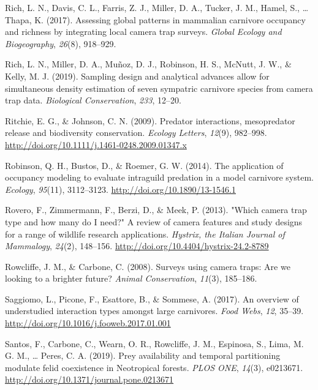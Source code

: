\documentclass[12pt,twoside]{reedthesis}
\begin{document}
\leavevmode\hypertarget{ref-rich_assessing_2017}{}%
Rich, L. N., Davis, C. L., Farris, Z. J., Miller, D. A., Tucker, J. M., Hamel, S., \ldots{} Thapa, K. (2017). Assessing global patterns in mammalian carnivore occupancy and richness by integrating local camera trap surveys. \emph{Global Ecology and Biogeography}, \emph{26}(8), 918--929.

\leavevmode\hypertarget{ref-rich_sampling_2019}{}%
Rich, L. N., Miller, D. A., Muñoz, D. J., Robinson, H. S., McNutt, J. W., \& Kelly, M. J. (2019). Sampling design and analytical advances allow for simultaneous density estimation of seven sympatric carnivore species from camera trap data. \emph{Biological Conservation}, \emph{233}, 12--20.

\leavevmode\hypertarget{ref-ritchie_predator_2009}{}%
Ritchie, E. G., \& Johnson, C. N. (2009). Predator interactions, mesopredator release and biodiversity conservation. \emph{Ecology Letters}, \emph{12}(9), 982--998. \url{http://doi.org/10.1111/j.1461-0248.2009.01347.x}

\leavevmode\hypertarget{ref-robinson_application_2014}{}%
Robinson, Q. H., Bustos, D., \& Roemer, G. W. (2014). The application of occupancy modeling to evaluate intraguild predation in a model carnivore system. \emph{Ecology}, \emph{95}(11), 3112--3123. \url{http://doi.org/10.1890/13-1546.1}

\leavevmode\hypertarget{ref-rovero_which_2013}{}%
Rovero, F., Zimmermann, F., Berzi, D., \& Meek, P. (2013). "Which camera trap type and how many do I need?" A review of camera features and study designs for a range of wildlife research applications. \emph{Hystrix, the Italian Journal of Mammalogy}, \emph{24}(2), 148--156. \url{http://doi.org/10.4404/hystrix-24.2-8789}

\leavevmode\hypertarget{ref-rowcliffe_surveys_2008}{}%
Rowcliffe, J. M., \& Carbone, C. (2008). Surveys using camera traps: Are we looking to a brighter future? \emph{Animal Conservation}, \emph{11}(3), 185--186.

\leavevmode\hypertarget{ref-saggiomo_overview_2017}{}%
Saggiomo, L., Picone, F., Esattore, B., \& Sommese, A. (2017). An overview of understudied interaction types amongst large carnivores. \emph{Food Webs}, \emph{12}, 35--39. \url{http://doi.org/10.1016/j.fooweb.2017.01.001}

\leavevmode\hypertarget{ref-santos_prey_2019}{}%
Santos, F., Carbone, C., Wearn, O. R., Rowcliffe, J. M., Espinosa, S., Lima, M. G. M., \ldots{} Peres, C. A. (2019). Prey availability and temporal partitioning modulate felid coexistence in Neotropical forests. \emph{PLOS ONE}, \emph{14}(3), e0213671. \url{http://doi.org/10.1371/journal.pone.0213671}
\end{document}
